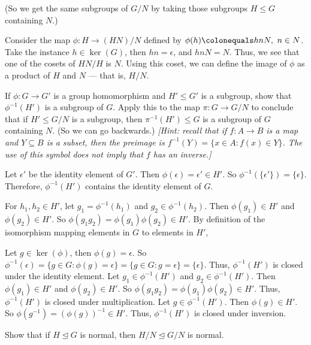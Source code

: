 \begin{problem}
\begin{enumalph}
      (So we get the same subgroups of $G/N$ by taking 
      those subgroups $H \leq G$ containing $N$.)
      \begin{Answer}
        Consider the map $\phi \colon H \to (HN)/N$ defined by
        $\phi(h) \colonequals hnN,\ n \in N$.
        Take the instance $h \in \ker(G)$, then $hn = \epsilon$,
        and $hnN = N$.
        Thus, we see that one of the cosets of $HN/H$ is $N$.
        Using this coset, we can define the image of $\phi$
        as a product of $H$ and $N$ --- that is, $H/N$.
      \end{Answer}
    \item If $\phi \colon G \to G'$ is a group homomorphism
      and $H' \leq G'$ is a subgroup,
      show that $\phi^{-1}(H')$ is a subgroup of $G$.
      Apply this to the map $\pi \colon G \to G/N$ to conclude that
      if $H' \leq G/N$ is a subgroup, then $\pi^{-1}(H') \leq G$
      is a subgroup of $G$ containing $N$.
      (So we can go backwards.)
      \emph{[Hint: recall that if $f \colon A \to B$ is a map
      and $Y \subseteq B$ is a subset, then the preimage is
      $f^{-1}(Y)=\{x \in A : f(x) \in Y\}$.
      The use of this symbol does not imply that $f$ has an inverse.]}
      \begin{Answer}
        \begin{enumalph}
          \item Let $\epsilon'$ be the identity element of $G'$.
            Then $\phi(\epsilon) = \epsilon' \in H'$.
            So $\phi^{-1}(\{\epsilon'\}) = \{\epsilon\}$.
            Therefore, $\phi^{-1}(H')$ contains the identity element of $G$.
          \item For $h_1, h_2 \in H'$, let $g_1 = \phi^{-1}(h_1)$ and $g_2 \in \phi^{-1}(h_2)$.
            Then $\phi(g_1) \in H'$ and $\phi(g_2) \in H'$.
            So $\phi(g_1g_2) = \phi(g_1)\phi(g_2) \in H'$.
            By definition of the isomorphism mapping elements in $G$ to elements in $H'$,
        \end{enumalph}
        Let $g \in \ker(\phi)$, then $\phi(g) = \epsilon$.
        So $\phi^{-1}(\epsilon) = \{g \in G : \phi(g) = \epsilon\} = \{g \in G : g = \epsilon\} = \{\epsilon\}$.
        Thus, $\phi^{-1}(H')$ is closed under the identity element.
        Let $g_1 \in \phi^{-1}(H')$ and $g_2 \in \phi^{-1}(H')$.
        Then $\phi(g_1) \in H'$ and $\phi(g_2) \in H'$.
        So $\phi(g_1g_2) = \phi(g_1)\phi(g_2) \in H'$.
        Thus, $\phi^{-1}(H')$ is closed under multiplication.
        Let $g \in \phi^{-1}(H')$.
        Then $\phi(g) \in H'$.
        So $\phi(g^{-1}) = (\phi(g))^{-1} \in H'$.
        Thus, $\phi^{-1}(H')$ is closed under inversion.
      \end{Answer}
    \item Show that if $H \trianglelefteq G$ is normal,
    then $H/N \trianglelefteq G/N$ is normal.
  \end{enumalph}
\end{problem}
